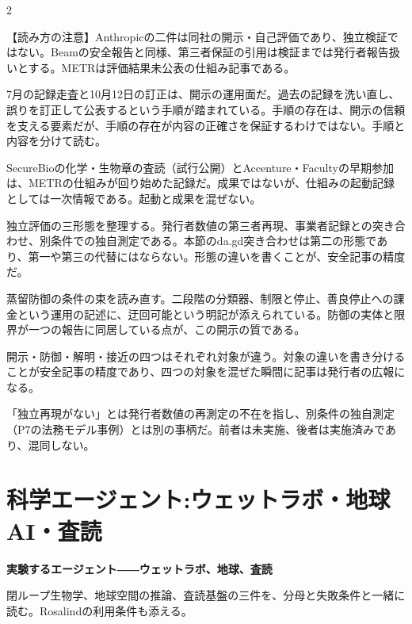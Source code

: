 \documentclass[lualatex,a4paper,10pt]{jlreq}
\begin{document}
\begin{multicols}{2} %

\begin{tcolorbox}[colback=SurveySoft,colframe=SurveyRule,arc=1mm,boxrule=0.4pt,left=2mm,right=2mm]
【読み方の注意】Anthropicの二件は同社の開示・自己評価であり、独立検証ではない。Beamの安全報告と同様、第三者保証の引用は検証までは発行者報告扱いとする。METRは評価結果未公表の仕組み記事である。
\end{tcolorbox}
\cite{B40,B79,B41,B80,B42,B81,B39,B82}

7月の記録走査と10月12日の訂正は、開示の運用面だ。過去の記録を洗い直し、誤りを訂正して公表するという手順が踏まれている。手順の存在は、開示の信頼を支える要素だが、手順の存在が内容の正確さを保証するわけではない。手順と内容を分けて読む。
\cite{B40,B79}


SecureBioの化学・生物章の査読（試行公開）とAccenture・Facultyの早期参加は、METRの仕組みが回り始めた記録だ。成果ではないが、仕組みの起動記録としては一次情報である。起動と成果を混ぜない。
\cite{B39,B82}


独立評価の三形態を整理する。発行者数値の第三者再現、事業者記録との突き合わせ、別条件での独自測定である。本節のda.gd突き合わせは第二の形態であり、第一や第三の代替にはならない。形態の違いを書くことが、安全記事の精度だ。
\cite{B40,B79}


蒸留防御の条件の束を読み直す。二段階の分類器、制限と停止、善良停止への課金という運用の記述に、迂回可能という明記が添えられている。防御の実体と限界が一つの報告に同居している点が、この開示の質である。
\cite{B41,B80}


開示・防御・解明・接近の四つはそれぞれ対象が違う。対象の違いを書き分けることが安全記事の精度であり、四つの対象を混ぜた瞬間に記事は発行者の広報になる。
\cite{B40,B79,B41,B80,B42,B81,B39,B82}


「独立再現がない」とは発行者数値の再測定の不在を指し、別条件の独自測定（P7の法務モデル事例）とは別の事柄だ。前者は未実施、後者は実施済みであり、混同しない。


\section{科学エージェント:ウェットラボ・地球AI・査読}
\label{sec:P6}

{\Large\bfseries 実験するエージェント――ウェットラボ、地球、査読\par}
\smallskip
{\color{SurveyMuted}閉ループ生物学、地球空間の推論、査読基盤の三件を、分母と失敗条件と一緒に読む。Rosalindの利用条件も添える。\par}
\bigskip


\end{multicols}
\end{document}
